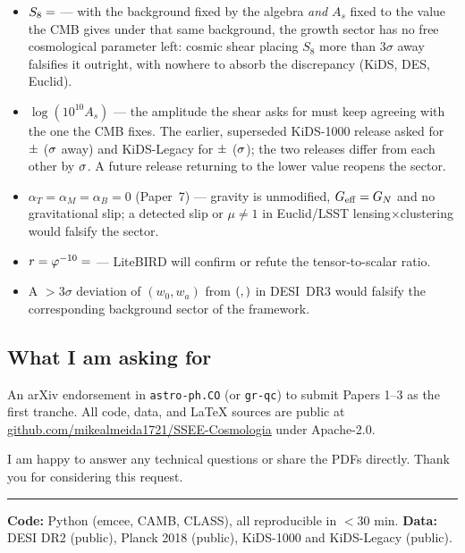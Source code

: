 \documentclass[11pt,a4paper]{article}
\begin{document}
\begin{itemize}
  \item $S_8=\val{S8_leg_pred}$ — with the background fixed by the algebra \emph{and}
    $A_s$ fixed to the value the CMB gives under that same background, the
    growth sector has no free cosmological parameter left: cosmic shear
    placing $S_8$ more than $3\sigma$ away falsifies it outright, with nowhere
    to absorb the discrepancy (KiDS, DES, Euclid).
  \item $\log(10^{10}A_s)$ — the amplitude the shear asks for must keep
    agreeing with the one the CMB fixes. The earlier, superseded KiDS-1000 release asked for $\val{logA_k1000}\pm\val{logA_k1000_sigma}$
    ($\val{logA_k1000_vs_cmb}\sigma$ away) and KiDS-Legacy for $\val{leg_logA}\pm\val{leg_logA_s}$ ($\val{logA_leg_vs_cmb}\sigma$);
    the two releases differ from each other by $\val{logA_entre_entregas}\sigma$. A future release
    returning to the lower value reopens the sector.
  \item $\alpha_T=\alpha_M=\alpha_B=0$ (Paper~7) — gravity is unmodified, $G_{\rm eff}=G_N$ and no gravitational slip; a detected slip or $\mu\neq1$ in Euclid/LSST lensing$\times$clustering would falsify the sector.
  \item $r=\varphi^{-10}=\val{R_TENSOR_d6}$ — LiteBIRD will confirm or refute the tensor-to-scalar ratio.
  \item A $>3\sigma$ deviation of $(w_0,w_a)$ from $(\val{W0_d3},\val{WA_d3})$ in DESI~DR3 would falsify the corresponding background sector of the framework.
\end{itemize}

\subsection*{What I am asking for}

An arXiv endorsement in \texttt{astro-ph.CO} (or \texttt{gr-qc}) to submit
Papers 1--3 as the first tranche. All code, data, and \LaTeX{} sources are
public at \href{https://github.com/mikealmeida1721/SSEE-Cosmologia}{github.com/mikealmeida1721/SSEE-Cosmologia}
under Apache-2.0.

I am happy to answer any technical questions or share the PDFs directly.
Thank you for considering this request.

\vspace{6pt}
\hrule
{\small \textbf{Code:} Python (emcee, CAMB, CLASS), all reproducible in $<$30 min.
\quad \textbf{Data:} DESI DR2 (public), Planck 2018 (public), KiDS-1000 and
KiDS-Legacy (public).}
\end{document}
